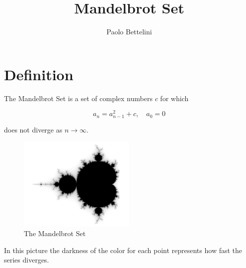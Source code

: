 \documentclass{article}
\title{Mandelbrot Set}
\author{Paolo Bettelini}
\date{}
\begin{document}
\maketitle
\tableofcontents
\pagebreak

\section{Definition}

The Mandelbrot Set is a set of complex numbers \(c\) for which

\[
    a_n = a_{n-1}^2 + c,\quad a_0=0
\]

does not diverge as \(n \to \infty\).

\begin{figure}[h]
    \centering
    \includegraphics[width=0.5\textwidth]{mandelbrot.jpg}
    \caption{The Mandelbrot Set}
    \label{fig:mesh1}
\end{figure}

In this picture the darkness of the color for each point
represents how fast the series diverges.

\pagebreak
\end{document}
